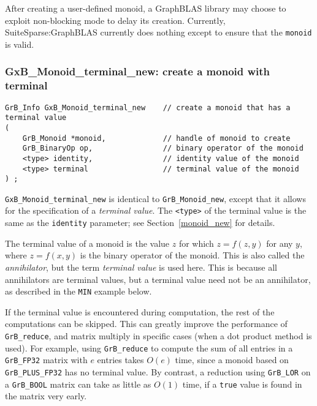\documentclass[12pt]{article}
\begin{document}
{After creating a user-defined monoid, a GraphBLAS library may choose to exploit
non-blocking mode to delay its creation.  Currently, SuiteSparse:GraphBLAS
currently does nothing except to ensure that the \verb'monoid' is valid.

\newpage
\subsubsection{{\sf GxB\_Monoid\_terminal\_new:} create a monoid with terminal}
\label{monoid_terminal_new}

\begin{mdframed}[userdefinedwidth=6in]
{\footnotesize
\begin{verbatim}
GrB_Info GxB_Monoid_terminal_new    // create a monoid that has a terminal value
(
    GrB_Monoid *monoid,             // handle of monoid to create
    GrB_BinaryOp op,                // binary operator of the monoid
    <type> identity,                // identity value of the monoid
    <type> terminal                 // terminal value of the monoid
) ;
\end{verbatim}
} \end{mdframed}

\verb'GxB_Monoid_terminal_new' is identical to \verb'GrB_Monoid_new', except
that it allows for the specification of a {\em terminal value}.  The
\verb'<type>' of the terminal value is the same as the \verb'identity'
parameter; see Section~\ref{monoid_new} for details.

The terminal value of a monoid is the value $z$ for which $z=f(z,y)$ for any
$y$, where $z=f(x,y)$ is the binary operator of the monoid.  This is also
called the {\em annihilator}, but the term {\em terminal value} is used here.
This is because all annihilators are terminal values, but a terminal value need
not be an annihilator, as described in the \verb'MIN' example below.

If the terminal value is encountered during computation, the rest of the
computations can be skipped.  This can greatly improve the performance of
\verb'GrB_reduce', and matrix multiply in specific cases (when a dot product
method is used).  For example, using \verb'GrB_reduce' to compute the sum of
all entries in a \verb'GrB_FP32' matrix with $e$ entries takes $O(e)$ time,
since a monoid based on \verb'GrB_PLUS_FP32' has no terminal value.  By
contrast, a reduction using \verb'GrB_LOR' on a \verb'GrB_BOOL' matrix can take
as little as $O(1)$ time, if a \verb'true' value is found in the matrix very
early.

}
\end{document}
